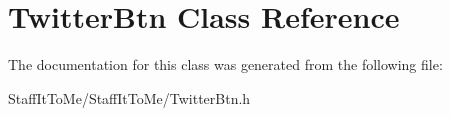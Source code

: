 \hypertarget{interface_twitter_btn}{
\section{\-Twitter\-Btn \-Class \-Reference}
\label{interface_twitter_btn}
}


\-The documentation for this class was generated from the following file\-:\begin{DoxyCompactItemize}
\item 
\-Staff\-It\-To\-Me/\-Staff\-It\-To\-Me/\-Twitter\-Btn.\-h\end{DoxyCompactItemize}
